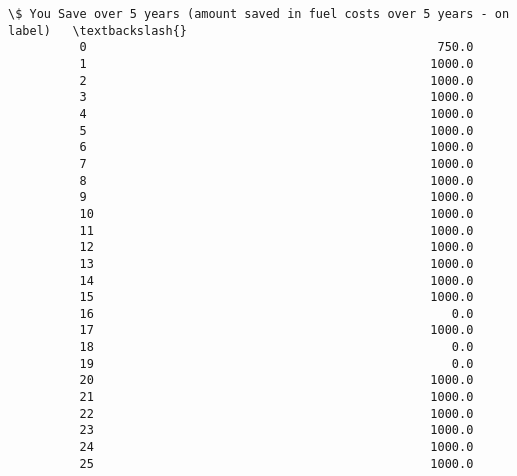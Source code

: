 \documentclass[11pt]{article}
\begin{document}
\begin{Verbatim}[commandchars=\\\{\}]
                \$ You Save over 5 years (amount saved in fuel costs over 5 years - on label)   \textbackslash{}
          0                                                 750.0                               
          1                                                1000.0                               
          2                                                1000.0                               
          3                                                1000.0                               
          4                                                1000.0                               
          5                                                1000.0                               
          6                                                1000.0                               
          7                                                1000.0                               
          8                                                1000.0                               
          9                                                1000.0                               
          10                                               1000.0                               
          11                                               1000.0                               
          12                                               1000.0                               
          13                                               1000.0                               
          14                                               1000.0                               
          15                                               1000.0                               
          16                                                  0.0                               
          17                                               1000.0                               
          18                                                  0.0                               
          19                                                  0.0                               
          20                                               1000.0                               
          21                                               1000.0                               
          22                                               1000.0                               
          23                                               1000.0                               
          24                                               1000.0                               
          25                                               1000.0                               

\end{Verbatim}
\end{document}
